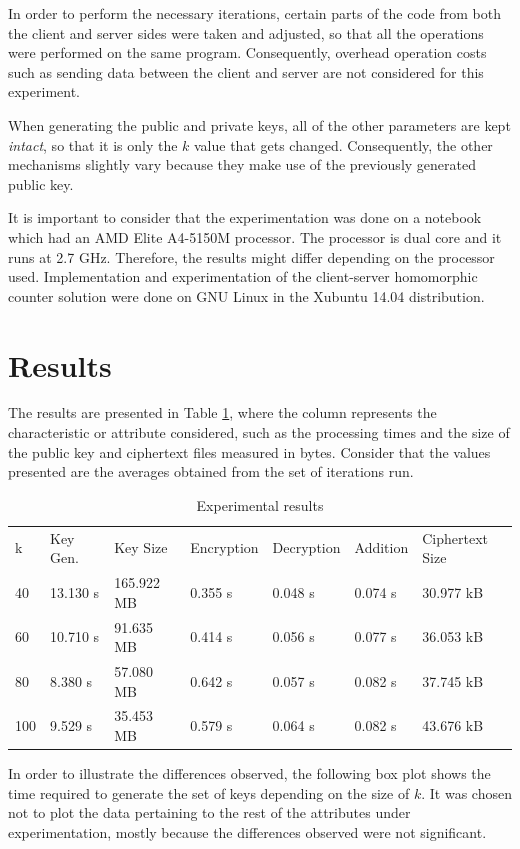 In order to perform the necessary iterations, certain parts of the code from both the client and server sides were taken and adjusted, so that all the operations were performed on the same program. Consequently, overhead operation costs such as sending data between the client and server are not considered for this experiment.

When generating the public and private keys, all of the other parameters are kept \emph{intact}, so that it is only the $k$ value that gets changed. Consequently, the other mechanisms slightly vary because they make use of the previously generated public key.

It is important to consider that the experimentation was done on a notebook which had an AMD Elite A4-5150M processor. The processor is dual core and it runs at 2.7 GHz. Therefore, the results might differ depending on the processor used. Implementation and experimentation of the client-server homomorphic counter solution were done on GNU Linux in the Xubuntu 14.04 distribution.

\section{Results}

The results are presented in Table \ref{tbl:results}, where the column represents the characteristic or attribute considered, such as the processing times and the size of the public key and ciphertext files measured in bytes. Consider that the values presented are the averages obtained from the set of iterations run.

\begin{table}[h]
  \caption{Experimental results}
  \label{tbl:results}
\begin{tabular}{lllllll}
k   & Key Gen. & Key Size  & Encryption & Decryption & Addition & Ciphertext Size \\
40  & 13.130 s & 165.922 MB & 0.355 s    & 0.048 s    & 0.074 s  & 30.977 kB        \\
60  & 10.710 s & 91.635 MB  & 0.414 s    & 0.056 s    & 0.077 s  & 36.053 kB        \\
80  & 8.380 s  & 57.080 MB  & 0.642 s    & 0.057 s    & 0.082 s  & 37.745 kB        \\
100 & 9.529 s  & 35.453 MB  & 0.579 s    & 0.064 s    & 0.082 s  & 43.676 kB
\end{tabular}
\end{table}

In order to illustrate the differences observed, the following box plot shows the time required to generate the set of keys depending on the size of $k$. It was chosen not to plot the data pertaining to the rest of the attributes under experimentation, mostly because the differences observed were not significant.

